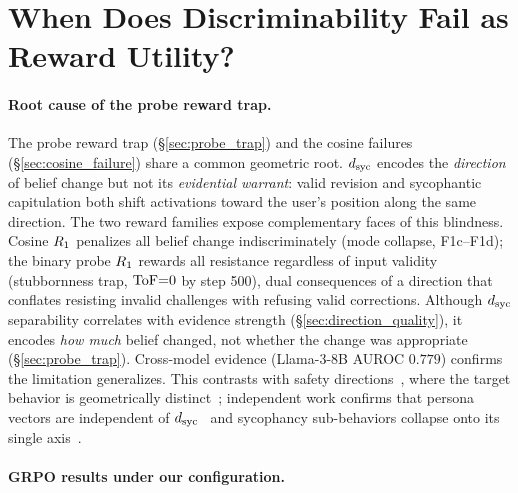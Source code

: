 \section{When Does Discriminability Fail as Reward Utility?}\label{sec:discussion}

\paragraph{Root cause of the probe reward trap.}
The probe reward trap (\S\ref{sec:probe_trap}) and the cosine failures (\S\ref{sec:cosine_failure}) share a common geometric root.
$d_{\text{syc}}$ encodes the \emph{direction} of belief change but not its \emph{evidential warrant}: valid revision and sycophantic capitulation both shift activations toward the user's position along the same direction.
The two reward families expose complementary faces of this blindness.
Cosine $R_1$ penalizes all belief change indiscriminately (mode collapse, F1c--F1d); the binary probe $R_1$ rewards all resistance regardless of input validity (stubbornness trap, $\text{ToF}{=}0$ by step 500), dual consequences of a direction that conflates resisting invalid challenges with refusing valid corrections.
Although $d_{\text{syc}}$ separability correlates with evidence strength (\S\ref{sec:direction_quality}), it encodes \emph{how much} belief changed, not whether the change was appropriate (\S\ref{sec:probe_trap}).
Cross-model evidence (Llama-3-8B AUROC $0.779$) confirms the limitation generalizes.
This contrasts with safety directions~\citep{zhang2026latentgrpo}, where the target behavior is geometrically distinct~\citep{wu2026rewardhacking}; independent work confirms that persona vectors are independent of $d_{\text{syc}}$~\citep{kelkar2026persona} and sycophancy sub-behaviors collapse onto its single axis~\citep{vennemeyer2025sycophancy}.

\paragraph{GRPO results under our configuration.}

